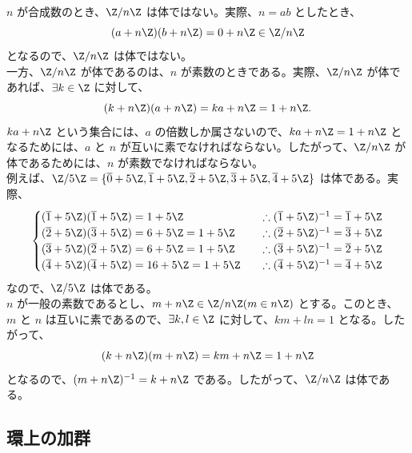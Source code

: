 \documentclass[article,paper=a4paper]{jlreq}
\begin{document}
\begin{ex}
\begin{enumerate}
      \quad $n$ が合成数のとき、$\Z/n\Z$ は体ではない。実際、$n = ab$ としたとき、
      \[(a + n\Z)(b + n\Z) = 0 + n\Z \in \Z/n\Z\] 
      となるので、$\Z/n\Z$ は体ではない。\\
      \quad 一方、$\Z/n\Z$ が体であるのは、$n$ が素数のときである。実際、$\Z/n\Z$ が体であれば、$\exists k \in \Z$ に対して、
      \[(k + n\Z)(a + n\Z) = ka + n\Z =  1 + n\Z.\]
      $ka + n\Z$ という集合には、$a$ の倍数しか属さないので、$ka + n\Z = 1 + n\Z$ となるためには、$a$ と $n$ が互いに素でなければならない。したがって、$\Z/n\Z$ が体であるためには、$n$ が素数でなければならない。\\
      \quad 例えば、$\Z/5\Z = \{\overline{0} + 5\Z, \overline{1} + 5\Z, \overline{2} + 5\Z, \overline{3} + 5\Z, \overline{4} + 5\Z\}$ は体である。実際、
      \begin{align*}
        \begin{cases}
          (\overline{1} + 5\Z)(\overline{1} + 5\Z) = 1 + 5\Z \quad &\therefore (\overline{1} + 5\Z)^{-1} = \overline{1} + 5\Z \\
          (\overline{2} + 5\Z)(\overline{3} + 5\Z) = 6 + 5\Z = 1 + 5\Z \quad &\therefore (\overline{2} + 5\Z)^{-1} = \overline{3} + 5\Z \\
          (\overline{3} + 5\Z)(\overline{2} + 5\Z) = 6 + 5\Z = 1 + 5\Z \quad &\therefore (\overline{3} + 5\Z)^{-1} = \overline{2} + 5\Z \\
          (\overline{4} + 5\Z)(\overline{4} + 5\Z) = 16 + 5\Z = 1 + 5\Z \quad &\therefore (\overline{4} + 5\Z)^{-1} = \overline{4} + 5\Z \\
        \end{cases}
      \end{align*}
      なので、$\Z/5\Z$ は体である。\\
      \quad $n$ が一般の素数であるとし、$m + n\Z \in \Z/n\Z (m \in n\Z)$ とする。このとき、 $m$ と $n$ は互いに素であるので、$\exists k, l \in \Z$ に対して、$km + ln = 1$ となる。したがって、
      \[(k + n\Z)(m + n\Z) = km + n\Z = 1 + n\Z\]
      となるので、$(m + n\Z)^{-1} = k + n\Z$ である。したがって、$\Z/n\Z$ は体である。
  \end{enumerate}
\end{ex}

\subsection{環上の加群}
\end{document}
